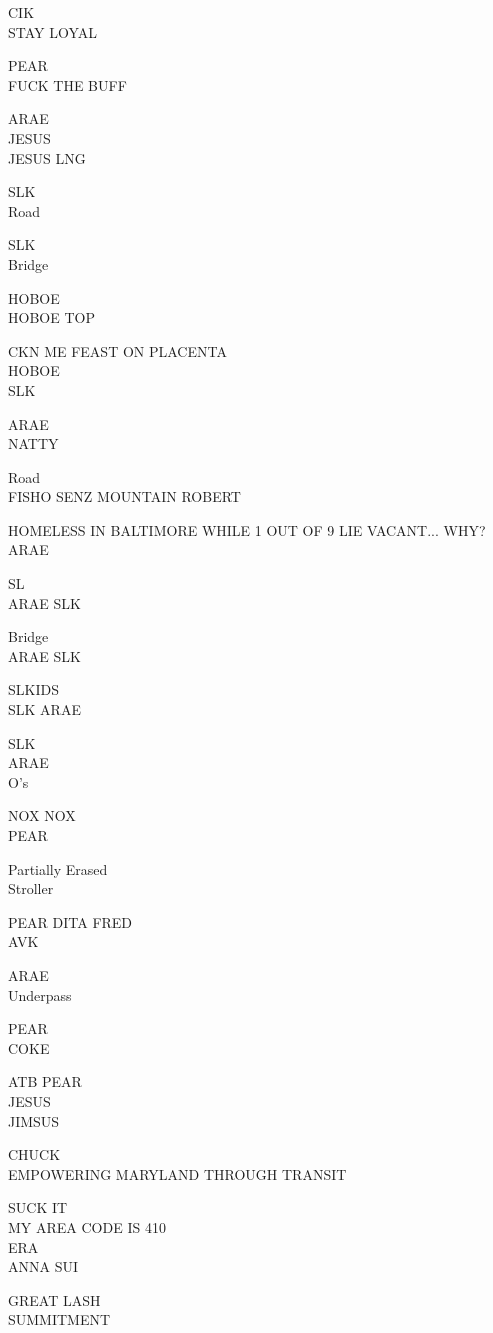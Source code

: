 \documentclass[10pt,letterpaper]{article}
\begin{document}
CIK\\
STAY LOYAL

PEAR\\
FUCK THE BUFF

ARAE\\
JESUS\\
JESUS LNG

SLK\\
Road

SLK\\
Bridge

HOBOE\\
HOBOE TOP

CKN ME FEAST ON PLACENTA\\
HOBOE\\
SLK

ARAE\\
NATTY

Road\\
FISHO SENZ MOUNTAIN ROBERT

HOMELESS IN BALTIMORE WHILE 1 OUT OF 9 LIE VACANT... WHY?\\
ARAE

SL\\
ARAE SLK

Bridge\\
ARAE SLK

SLKIDS\\
SLK ARAE

SLK\\
ARAE\\
O's

NOX NOX\\
PEAR

Partially Erased\\
Stroller

PEAR DITA FRED\\
AVK

ARAE\\
Underpass

PEAR\\
COKE

ATB PEAR\\
JESUS\\
JIMSUS

CHUCK\\
EMPOWERING MARYLAND THROUGH TRANSIT

SUCK IT\\
MY AREA CODE IS 410\\
ERA\\
ANNA SUI

GREAT LASH\\
SUMMITMENT
\
\end{document}
